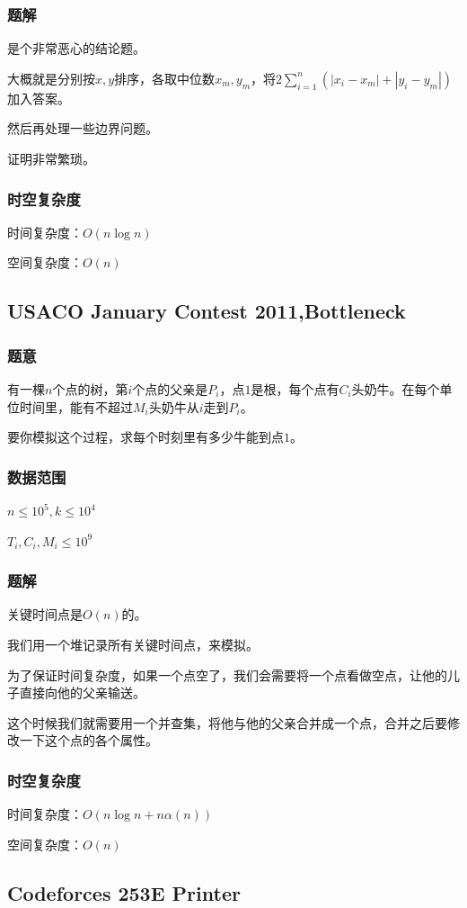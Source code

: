 \documentclass{ctexart}
\begin{document}
\subsubsection{题解}
是个非常恶心的结论题。

大概就是分别按$x,y$排序，各取中位数$x_m,y_m$，将$2\sum_{i=1}^n(|x_i-x_m|+|y_i-y_m|)$加入答案。

然后再处理一些边界问题。

证明非常繁琐。
\subsubsection{时空复杂度}
时间复杂度：$O(n \log n)$

空间复杂度：$O(n)$
\subsection{USACO January Contest 2011,Bottleneck}
\subsubsection{题意}
有一棵$n$个点的树，第$i$个点的父亲是$P_i$，点$1$是根，每个点有$C_i$头奶牛。在每个单位时间里，能有不超过$M_i$头奶牛从$i$走到$P_i$。

要你模拟这个过程，求每个时刻里有多少牛能到点$1$。
\subsubsection{数据范围}
$n \le 10^5,k \le 10^4$

$T_i,C_i,M_i \le 10^9$
\subsubsection{题解}
关键时间点是$O(n)$的。

我们用一个堆记录所有关键时间点，来模拟。

为了保证时间复杂度，如果一个点空了，我们会需要将一个点看做空点，让他的儿子直接向他的父亲输送。

这个时候我们就需要用一个并查集，将他与他的父亲合并成一个点，合并之后要修改一下这个点的各个属性。
\subsubsection{时空复杂度}
时间复杂度：$O(n \log n+n \alpha(n))$

空间复杂度：$O(n)$
\subsection{Codeforces 253E Printer}
\end{document}
